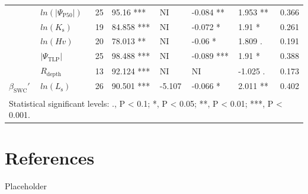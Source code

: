 \documentclass[11pt,twoside]{reedthesis}
\begin{document}
\begin{table}
{\begin{tabular}[t]{llrllllr}
 & $ln(\rvert\Psi_{\text{P50}}\rvert)$ & 25 & 95.16 *** & NI & -0.084 ** & 1.953 ** & 0.366\\
\cmidrule{2-8}
 & $ln(K_{\text{s}})$ & 19 & 84.858 *** & NI & -0.072 * & 1.91 * & 0.261\\
\cmidrule{2-8}
 & $ln(Hv)$ & 20 & 78.013 ** & NI & -0.06 * & 1.809 . & 0.191\\
\cmidrule{2-8}
 & $\rvert\Psi_{\text{TLP}}\rvert$ & 25 & 98.488 *** & NI & -0.089 *** & 1.91 * & 0.388\\
\cmidrule{2-8}
 & $R_{\text{depth}}$ & 13 & 92.124 *** & NI & NI & -1.025 . & 0.173\\
\cmidrule{2-8}
\multirow{-6}{*}{\raggedright\arraybackslash $\beta_{\text{SWC}}'$} & $ln(L_{\text{s}})$ & 26 & 90.501 *** & -5.107 & -0.066 * & 2.011 ** & 0.402\\
\bottomrule
\multicolumn{8}{l}{\textsuperscript{} Statistical significant levels: ., P < 0.1; *, P < 0.05; **, P < 0.01; ***, P < 0.001.}\\
\end{tabular}}
\end{table}
\chapter*{References}\label{references}

Placeholder


\end{document}
